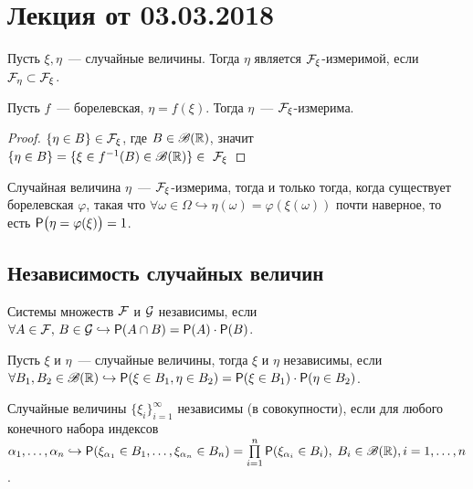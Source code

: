 \section{Лекция от 03.03.2018}
\setcounter{property}{0}

\begin{definition}
	Пусть $\xi, \eta$~--- случайные величины. Тогда $\eta$ является $\F_\xi$-измеримой, если $\F_\eta \subset \F_\xi$.
\end{definition}

\begin{example}
	Пусть $f$~--- борелевская, $\eta = f(\xi)$. Тогда $\eta$~--- $\F_\xi$-измерима.
	\begin{proof}
		$\{\eta \in B\} \in \F_\xi$, где $B \in \B(\R)$, значит $\{\eta \in B\} = \{\xi \in f^{-1}(B) \in \B(\R)\} \in~\F_\xi$
	\end{proof}
\end{example}

\begin{theorem}[][б/д]
	Случайная величина $\eta$~--- $\F_\xi$-измерима, тогда и только тогда, когда существует борелевская $\varphi$, такая что $\forall \omega \in \Omega \hookrightarrow \eta(\omega) = \varphi(\xi(\omega))$ почти наверное, то есть $\P\big(\eta = \varphi(\xi)\big) = 1$.
\end{theorem}

\subsection{Независимость случайных величин}

\begin{definition}
	Системы множеств $\F$ и $\G$ независимы, если $\forall A \in \F,\, B \in \G \hookrightarrow \P(A \cap B) = \P(A)\cdot\P(B)$.
\end{definition}

\begin{definition}
	Пусть $\xi$ и $\eta$~--- случайные величины, тогда $\xi$ и $\eta$ независимы, если $\forall B_1, B_2 \in \B(\R) \hookrightarrow  \P(\xi \in B_1, \eta \in B_2) = \P(\xi \in B_1)\cdot\P(\eta \in B_2)$.
\end{definition}

\begin{definition}
	Случайные величины $\{\xi_i\}_{i = 1}^\infty$ независимы (в совокупности), если для любого конечного набора индексов $\alpha_1, \ldots, \alpha_n \hookrightarrow \P(\xi_{\alpha_1} \in B_1, \ldots, \xi_{\alpha_n} \in B_n) = \prod\limits_{i = 1}^n\P(\xi_{\alpha_i} \in B_i),\; B_i \in \B(\R), i = 1, \ldots, n$.
\end{definition}

